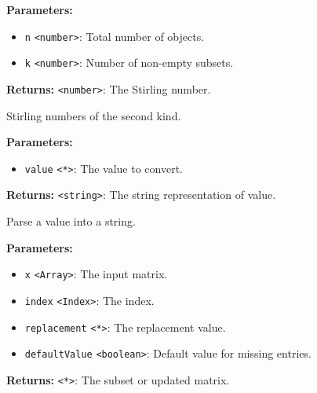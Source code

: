 \documentclass[12pt,a4paper]{article}
\begin{document}
\vspace{5mm}
\noindent {}


\noindent \textbf{Parameters:}
\begin{itemize}
  \item \texttt{n} \texttt{<number>}: Total number of objects.
  \item \texttt{k} \texttt{<number>}: Number of non-empty subsets.
\end{itemize}

\noindent \textbf{Returns:} \texttt{<number>}: The Stirling number.

\noindent Stirling numbers of the second kind.

\vspace{5mm}
\noindent {}


\noindent \textbf{Parameters:}
\begin{itemize}
  \item \texttt{value} \texttt{<*>}: The value to convert.
\end{itemize}

\noindent \textbf{Returns:} \texttt{<string>}: The string representation of value.

\noindent Parse a value into a string.

\vspace{5mm}
\noindent {}


\noindent \textbf{Parameters:}
\begin{itemize}
  \item \texttt{x} \texttt{<Array>}: The input matrix.
  \item \texttt{index} \texttt{<Index>}: The index.
  \item \texttt{replacement} \texttt{<*>}: The replacement value.
  \item \texttt{defaultValue} \texttt{<boolean>}: Default value for missing entries.
\end{itemize}

\noindent \textbf{Returns:} \texttt{<*>}: The subset or updated matrix.
\end{document}
